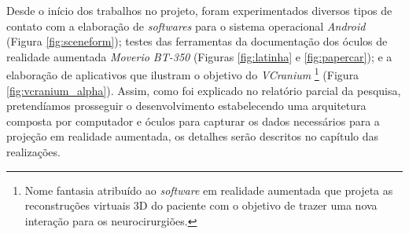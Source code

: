 Desde o início dos trabalhos no projeto, foram experimentados diversos tipos de contato com a elaboração de \textit{softwares} para o sistema operacional \textit{Android} (Figura \ref{fig:sceneform}); testes das ferramentas da documentação dos óculos de realidade aumentada \textit{Moverio BT-350} (Figuras \ref{fig:latinha} e \ref{fig:papercar}); e a elaboração de aplicativos que ilustram o objetivo do \textit{VCranium} \footnote[1]{Nome fantasia atribuído ao \textit{software} em realidade aumentada que projeta as reconstruções virtuais 3D do paciente com o objetivo de trazer uma nova interação para os neurocirurgiões.}
(Figura \ref{fig:vcranium_alpha}). Assim, como foi explicado no relatório parcial da pesquisa, pretendíamos prosseguir o desenvolvimento estabelecendo uma arquitetura composta por computador e óculos para capturar os dados necessários para a projeção em realidade aumentada, os detalhes serão descritos no capítulo das realizações.

